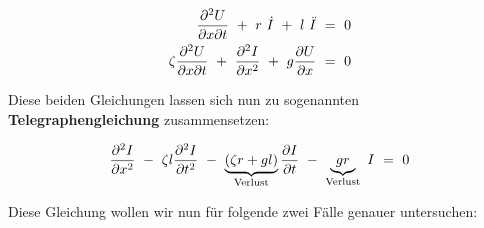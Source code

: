 \begin{align*}
\frac{\partial^2 U}{\partial x \partial t} \ + \ r \ \dot{I} \ + \ l \ \ddot{I}  \ &= \ 0\\
\zeta\frac{\partial^2 U}{\partial x \partial t} \ + \ \pddiff{I}{x} \ + \ g \pdiff{U}{x}  \ &= \ 0
\end{align*}

Diese beiden Gleichungen lassen sich nun zu sogenannten \textbf{Telegraphengleichung} zusammensetzen:

\begin{equation*}
\frac{\partial ^2{I}}{\partial{x}^2} \ - \ \zeta l \frac{\partial ^2{I}}{\partial{t}^2} \ - \ \underbrace{\left(\zeta r + g l \right)}_{\text{Verlust}}\frac{\partial{I}}{\partial{t}} \ - \ \underbrace{g r}_{\text{Verlust}} \ I \ = \ 0
\end{equation*}


Diese Gleichung wollen wir nun für folgende zwei Fälle genauer untersuchen:

